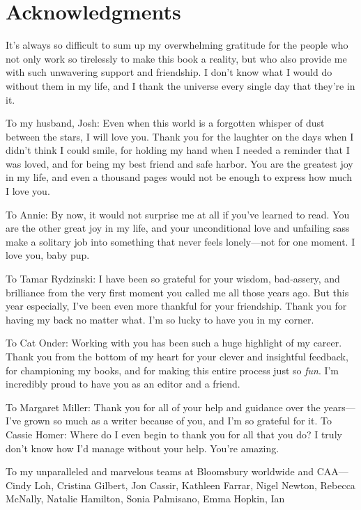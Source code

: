 
\chapter*{Acknowledgments}

It's always so difficult to sum up my overwhelming gratitude for the people who not only work so tirelessly to make this book a reality, but who also provide me with such unwavering support and friendship. I don't know what I would do without them in my life, and I thank the universe every single day that they're in it.

To my husband, Josh: Even when this world is a forgotten whisper of dust between the stars, I will love you. Thank you for the laughter on the days when I didn't think I could smile, for holding my hand when I needed a reminder that I was loved, and for being my best friend and safe harbor. You are the greatest joy in my life, and even a thousand pages would not be enough to express how much I love you.

To Annie: By now, it would not surprise me at all if you've learned to read. You are the other great joy in my life, and your unconditional love and unfailing sass make a solitary job into something that never feels lonely---not for one moment. I love you, baby pup.

To Tamar Rydzinski: I have been so grateful for your wisdom, bad-assery, and brilliance from the very first moment you called me all those years ago. But this year especially, I've been even more thankful for your friendship. Thank you for having my back no matter what. I'm so lucky to have you in my corner.

To Cat Onder: Working with you has been such a huge highlight of my career. Thank you from the bottom of my heart for your clever and insightful feedback, for championing my books, and for making this entire process just so \emph{fun}. I'm incredibly proud to have you as an editor and a friend.

To Margaret Miller: Thank you for all of your help and guidance over the years---I've grown so much as a writer because of you, and I'm so grateful for it. To Cassie Homer: Where do I even begin to thank you for all that you do? I truly don't know how I'd manage without your help. You're amazing.

To my unparalleled and marvelous teams at Bloomsbury worldwide and CAA---Cindy Loh, Cristina Gilbert, Jon Cassir, Kathleen Farrar, Nigel Newton, Rebecca McNally, Natalie Hamilton, Sonia Palmisano, Emma Hopkin, Ian

